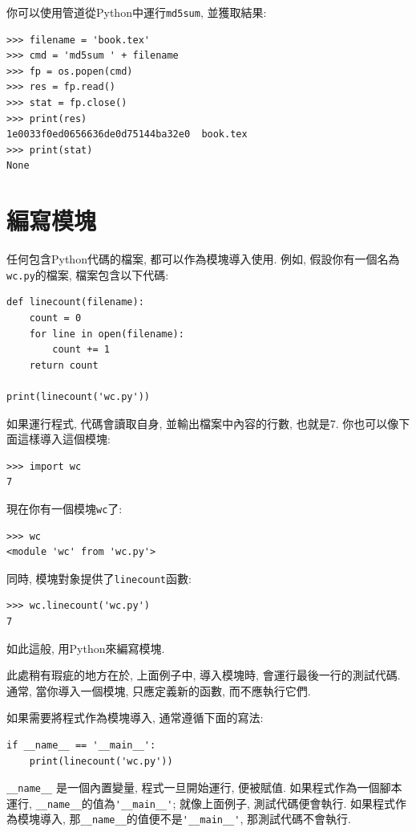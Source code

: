 \documentclass[10pt]{book}
\begin{document}
你可以使用管道從Python中運行{\tt md5sum}, 並獲取結果:

\begin{verbatim}
>>> filename = 'book.tex'
>>> cmd = 'md5sum ' + filename
>>> fp = os.popen(cmd)
>>> res = fp.read()
>>> stat = fp.close()
>>> print(res)
1e0033f0ed0656636de0d75144ba32e0  book.tex
>>> print(stat)
None
\end{verbatim}



\section{編寫模塊}
\label{modules}
任何包含Python代碼的檔案, 都可以作為模塊導入使用. 
例如, 假設你有一個名為{\tt wc.py}的檔案, 檔案包含以下代碼:

\begin{verbatim}
def linecount(filename):
    count = 0
    for line in open(filename):
        count += 1
    return count

print(linecount('wc.py'))
\end{verbatim}
%
如果運行程式, 代碼會讀取自身, 並輸出檔案中內容的行數, 也就是7.
你也可以像下面這樣導入這個模塊:

\begin{verbatim}
>>> import wc
7
\end{verbatim}
%
現在你有一個模塊{\tt wc}了:

\begin{verbatim}
>>> wc
<module 'wc' from 'wc.py'>
\end{verbatim}
%
同時, 模塊對象提供了\verb"linecount"函數:

\begin{verbatim}
>>> wc.linecount('wc.py')
7
\end{verbatim}
%
如此這般, 用Python來編寫模塊. 

此處稍有瑕疵的地方在於, 上面例子中, 導入模塊時, 
會運行最後一行的測試代碼. 
通常, 當你導入一個模塊, 只應定義新的函數, 而不應執行它們.

如果需要將程式作為模塊導入, 通常遵循下面的寫法:

\begin{verbatim}
if __name__ == '__main__':
    print(linecount('wc.py'))
\end{verbatim}
%
\verb"__name__" 是一個內置變量, 程式一旦開始運行, 便被賦值. 
如果程式作為一個腳本運行, \verb"__name__"的值為\verb"'__main__'";
就像上面例子, 測試代碼便會執行. 
如果程式作為模塊導入, 那\verb"__name__"的值便不是\verb"'__main__'", 
那測試代碼不會執行. 
\end{document}
